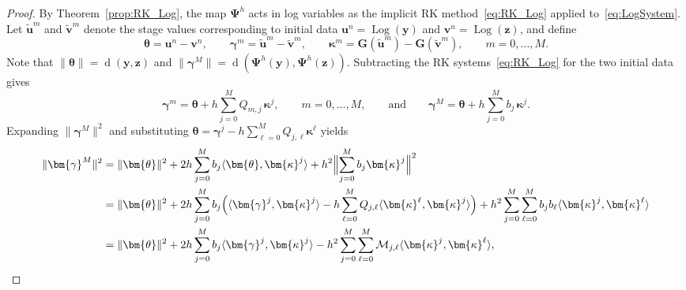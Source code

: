 \documentclass[a4paper,num-refs]{oup-contemporary-spidec}
\begin{document}
\begin{proof}
    By Theorem~\ref{prop:RK_Log}, the map $\bm{\Psi}^h$ 
    acts in log variables as the implicit RK 
    method~\eqref{eq:RK_Log} applied 
    to~\eqref{eq:LogSystem}. Let $\tilde{\bm{u}}^m$ and 
    $\tilde{\bm{v}}^m$ denote the stage values 
    corresponding to initial data 
    $\bm{u}^n=\operatorname{Log}(\bm{y})$ and 
    $\bm{v}^n=\operatorname{Log}(\bm{z})$, and define
    \[
        \bm{\theta} = \bm{u}^n - \bm{v}^n,
        \qquad
        \bm{\gamma}^m = \tilde{\bm{u}}^m 
                        - \tilde{\bm{v}}^m,
        \qquad
        \bm{\kappa}^m = \bm{G}(\tilde{\bm{u}}^m)
                        - \bm{G}(\tilde{\bm{v}}^m),
        \qquad m=0,\dots,M.
    \]
    Note that $\|\bm{\theta}\|
    = \operatorname{d}(\bm{y},\bm{z})$ and 
    $\|\bm{\gamma}^M\|
    = \operatorname{d}(\bm{\Psi}^h(\bm{y}),
                      \bm{\Psi}^h(\bm{z}))$.
    Subtracting the RK systems~\eqref{eq:RK_Log} for 
    the two initial data gives
    \[
        \bm{\gamma}^m 
        = \bm{\theta} 
          + h\sum_{j=0}^M Q_{m,j}\,\bm{\kappa}^j,
        \qquad m=0,\dots,M,
        \qquad\text{and}\qquad
        \bm{\gamma}^M 
        = \bm{\theta} 
          + h\sum_{j=0}^M b_j\,\bm{\kappa}^j.
    \]
    Expanding $\|\bm{\gamma}^M\|^2$ and substituting 
    $\bm{\theta} = \bm{\gamma}^j 
    - h\sum_{\ell=0}^M Q_{j,\ell}\bm{\kappa}^\ell$ yields
    \begin{equation}\label{eq:NormExpansion}
        \begin{split}
        \|\bm{\gamma}^M\|^2
        &= \|\bm{\theta}\|^2
           + 2h\sum_{j=0}^M b_j
             \langle\bm{\theta},\bm{\kappa}^j\rangle
           + h^2\Bigl\|\sum_{j=0}^M 
             b_j\bm{\kappa}^j\Bigr\|^2 \\
        &= \|\bm{\theta}\|^2
           + 2h\sum_{j=0}^M b_j
             \Bigl(\langle\bm{\gamma}^j,\bm{\kappa}^j\rangle
             - h\sum_{\ell=0}^M Q_{j,\ell}
               \langle\bm{\kappa}^\ell,
                       \bm{\kappa}^j\rangle\Bigr)
           + h^2\sum_{j=0}^M\sum_{\ell=0}^M
             b_j b_\ell
             \langle\bm{\kappa}^j,\bm{\kappa}^\ell
             \rangle \\
        &= \|\bm{\theta}\|^2
           + 2h\sum_{j=0}^M b_j
             \langle\bm{\gamma}^j,\bm{\kappa}^j\rangle
           - h^2\sum_{j=0}^M\sum_{\ell=0}^M
             \mathcal{M}_{j,\ell}
             \langle\bm{\kappa}^j,
                     \bm{\kappa}^\ell\rangle,
        \end{split}
    \end{equation}

\end{proof}
\end{document}
